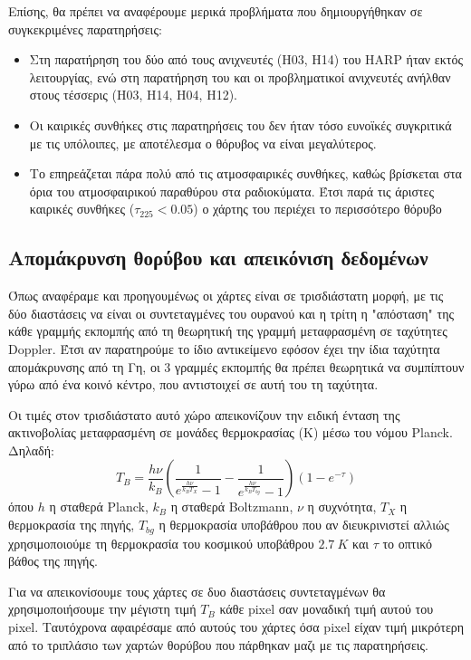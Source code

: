 \documentclass[a4paper,12pt]{memoir}
\begin{document}
Επίσης, θα πρέπει να αναφέρουμε μερικά προβλήματα που δημιουργήθηκαν σε συγκεκριμένες παρατηρήσεις:
\begin{itemize}
\item Στη παρατήρηση του  δύο από τους ανιχνευτές (H03, H14) του HARP ήταν εκτός λειτουργίας, ενώ στη παρατήρηση του  και  οι προβληματικοί ανιχνευτές ανήλθαν στους τέσσερις (H03, H14, H04, H12). 
\item Οι καιρικές συνθήκες στις παρατηρήσεις του  δεν ήταν τόσο ευνοϊκές συγκριτικά με τις υπόλοιπες, με αποτέλεσμα ο θόρυβος να είναι μεγαλύτερος.
\item Το  επηρεάζεται πάρα πολύ από τις ατμοσφαιρικές συνθήκες, καθώς βρίσκεται στα όρια του ατμοσφαιρικού παραθύρου στα ραδιοκύματα. Έτσι παρά τις άριστες καιρικές συνθήκες ($\tau _{225} <0.05$) ο χάρτης του  περιέχει το περισσότερο θόρυβο
\end{itemize}

\subsection{Απομάκρυνση θορύβου και απεικόνιση δεδομένων}
Όπως αναφέραμε και προηγουμένως οι χάρτες είναι σε τρισδιάστατη μορφή, με τις δύο διαστάσεις να είναι οι συντεταγμένες του ουρανού και η τρίτη η "απόσταση" της κάθε γραμμής εκπομπής από τη θεωρητική της γραμμή μεταφρασμένη σε ταχύτητες Doppler. Έτσι αν παρατηρούμε το ίδιο αντικείμενο εφόσον έχει την ίδια ταχύτητα απομάκρυνσης από τη Γη, οι 3 γραμμές εκπομπής θα πρέπει θεωρητικά να συμπίπτουν γύρω από ένα κοινό κέντρο, που αντιστοιχεί σε αυτή του τη ταχύτητα.

Οι τιμές στον τρισδιάστατο αυτό χώρο απεικονίζουν την ειδική ένταση της ακτινοβολίας μεταφρασμένη σε μονάδες θερμοκρασίας (K) μέσω του νόμου Planck. Δηλαδή:
\begin{equation}
\label{eq:TB}
T_B=\frac{h \nu}{k_B} \left( \frac{1}{e^{\frac{h \nu}{k_B T_X}}-1}-\frac{1}{e^{\frac{h \nu}{k_B T_{bg}}}-1} \right) \left( 1-e^{-\tau} \right) 
\end{equation}
όπου $h$ η σταθερά Planck, $k_B$ η σταθερά Boltzmann, $\nu$ η συχνότητα, $T_X$ η θερμοκρασία της πηγής, $T_{bg} $ η θερμοκρασία υποβάθρου που αν διευκρινιστεί αλλιώς χρησιμοποιούμε τη θερμοκρασία του κοσμικού υποβάθρου $2.7\ K$ και $\tau$ το οπτικό βάθος της πηγής.

Για να απεικονίσουμε τους χάρτες σε δυο διαστάσεις συντεταγμένων θα χρησιμοποιήσουμε την μέγιστη
 τιμή $T_B$ κάθε pixel σαν μοναδική τιμή αυτού του pixel. Ταυτόχρονα αφαιρέσαμε από αυτούς του χάρτες όσα pixel είχαν τιμή μικρότερη από το τριπλάσιο των χαρτών θορύβου που πάρθηκαν μαζι με τις παρατηρήσεις.
\end{document}
